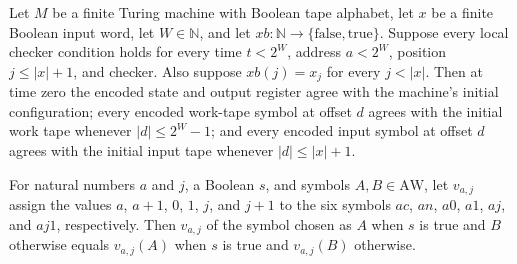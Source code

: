 \begin{theorem}
\label{Complexity.Meyer.correct_zero}
\leanok
{}
Let $M$ be a finite Turing machine with Boolean tape alphabet, let $x$ be a finite
Boolean input word, let $W\in\mathbb{N}$, and let
$xb:\mathbb{N}\to\{\mathrm{false},\mathrm{true}\}$. Suppose every local checker
condition holds for every time $t<2^W$, address $a<2^W$, position $j\le |x|+1$, and
checker. Also suppose $xb(j)=x_j$ for every $j<|x|$. Then at time zero the encoded state
and output register agree with the machine's initial configuration; every encoded
work-tape symbol at offset $d$ agrees with the initial work tape whenever $|d|\le
2^W-1$; and every encoded input symbol at offset $d$ agrees with the initial input tape
whenever $|d|\le |x|+1$.
\end{theorem}

\begin{theorem}
\label{Complexity.Meyer.avOf_ite}
\leanok
{}
For natural numbers $a$ and $j$, a Boolean $s$, and symbols $A,B\in\mathrm{AW}$, let
$v_{a,j}$ assign the values $a$, $a+1$, $0$, $1$, $j$, and $j+1$ to the six symbols
$ac$, $an$, $a0$, $a1$, $aj$, and $aj1$, respectively. Then $v_{a,j}$ of the symbol
chosen as $A$ when $s$ is true and $B$ otherwise equals $v_{a,j}(A)$ when $s$ is true
and $v_{a,j}(B)$ otherwise.
\end{theorem}

